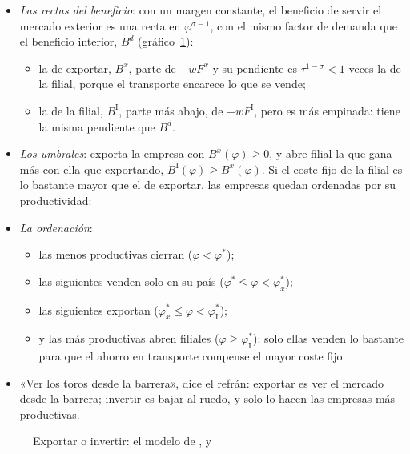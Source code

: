 \documentclass[11pt]{article}
\begin{document}
\begin{itemize}
\item \emph{Las rectas del beneficio}: con un margen constante, el beneficio de servir el mercado exterior es una recta en $\varphi^{\sigma-1}$, con el mismo factor de demanda que el beneficio interior, $B^d$ (gráfico~\ref{fig:hmy}):
  \begin{itemize}
  \item la de exportar, $B^x$, parte de $-wF^x$ y su pendiente es $\tau^{1-\sigma}<1$ veces la de la filial, porque el transporte encarece lo que se vende;
  \item la de la filial, $B^{\mathrm I}$, parte más abajo, de $-wF^{\mathrm I}$, pero es más empinada: tiene la misma pendiente que $B^d$.
  \end{itemize}
\item \emph{Los umbrales}: exporta la empresa con $B^x(\varphi)\geq0$, y abre filial la que gana más con ella que exportando, $B^{\mathrm I}(\varphi)\geq B^x(\varphi)$. Si el coste fijo de la filial es lo bastante mayor que el de exportar, las empresas quedan ordenadas por su productividad:
\item \emph{La ordenación}:
  \begin{itemize}
  \item las menos productivas cierran ($\varphi<\varphi^*$);
  \item las siguientes venden solo en su país ($\varphi^*\leq\varphi<\varphi^*_x$);
  \item las siguientes exportan ($\varphi^*_x\leq\varphi<\varphi^*_{\mathrm I}$);
  \item y las más productivas abren filiales ($\varphi\geq\varphi^*_{\mathrm I}$): solo ellas venden lo bastante para que el ahorro en transporte compense el mayor coste fijo.
  \end{itemize}
\item «Ver los toros desde la barrera», dice el refrán: exportar es ver el mercado desde la barrera; invertir es bajar al ruedo, y solo lo hacen las empresas más productivas.
\end{itemize}

\begin{figure}[H]
\centering
\caption{Exportar o invertir: el modelo de ,  y }\label{fig:hmy}
\end{figure}
\end{document}
